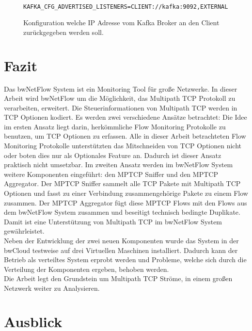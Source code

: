 \documentclass[a4paper, 12pt]{article}
\begin{document}
\begin{figure}[H]
\begin{lstlisting}
 KAFKA_CFG_ADVERTISED_LISTENERS=CLIENT://kafka:9092,EXTERNAL://193.196.38.1:9093 
\end{lstlisting}
\caption{Konfiguration welche IP Adresse vom Kafka Broker an den Client zurückgegeben werden soll.}
\label{listing:advertised_listener}
\end{figure}


\section{Fazit}
Das bwNetFlow System ist ein Monitoring Tool für große Netzwerke.
In dieser Arbeit wird bwNetFlow um die Möglichkeit, das Multipath TCP Protokoll zu verarbeiten, erweitert.
Die Steuerinformationen von Multipath TCP werden in TCP Optionen kodiert. 
Es werden zwei verschiedene Ansätze betrachtet:
Die Idee im ersten Ansatz liegt darin, herkömmliche Flow Monitoring Protokolle zu benutzen, um TCP Optionen zu erfassen.
Alle in dieser Arbeit betrachteten Flow Monitoring Protokolle unterstützten das Mitschneiden von TCP Optionen nicht oder boten dies nur als Optionales Feature an.
Dadurch ist dieser Ansatz praktisch nicht umsetzbar.
Im zweiten Ansatz werden im bwNetFlow System weitere Komponenten eingeführt: den MPTCP Sniffer und den MPTCP Aggregator.
Der MPTCP Sniffer sammelt alle TCP Pakete mit Multipath TCP Optionen und fasst zu einer Verbindung zusammengehörige Pakete zu einem Flow zusammen.
Der MPTCP Aggregator fügt diese MPTCP Flows mit den Flows aus dem bwNetFlow System zusammen und beseitigt technisch bedingte Duplikate.
Damit ist eine Unterstützung von Multipath TCP im bwNetFlow System gewährleistet.
\\
Neben der Entwicklung der zwei neuen Komponenten wurde das System in der bwCloud testweise auf drei Virtuellen Maschinen installiert.
Dadurch kann der Betrieb als verteiltes System erprobt werden und Probleme, welche sich durch die Verteilung der Komponenten ergeben, behoben werden.
\\
Die Arbeit legt den Grundstein um Multipath TCP Ströme, in einem großen Netzwerk weiter zu Analysieren.


\section{Ausblick}
\end{document}
